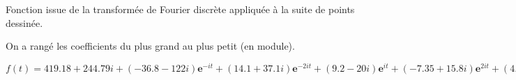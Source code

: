 \documentclass[10pt,a4paper]{article}
\begin{document}
\begin{center}
\begin{LARGE}Fonction issue de la transformée de Fourier discrète appliquée à la suite de points dessinée.
\end{LARGE}
\end{center}

On a rangé les coefficients du plus grand au plus petit (en module).
\vspace{2em}

$f(t)=419.18+244.79i+(-36.8-122i)\textbf{e}^{-it}+(14.1+37.1i)\textbf{e}^{-2it}+(9.2-20i)\textbf{e}^{it}+(-7.35+15.8i)\textbf{e}^{2it}+(4.6+2.67i)\textbf{e}^{-3it}+(-4.49-1.92i)\textbf{e}^{-4it}+(4.02-0.726i)\textbf{e}^{6it}+(-3.77+1.04i)\textbf{e}^{7it}+(-3.76+0.377i)\textbf{e}^{-9it}+(3.21+0.107i)\textbf{e}^{-8it}$
\end{document}
